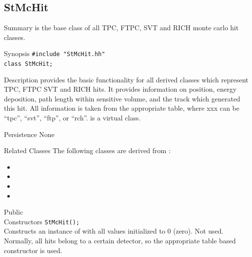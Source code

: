 \clearpage
%
%
\subsection{StMcHit}
 
\label{sec:StMcHit}
\begin{Entry}
\item[Summary]
     is the base class of all TPC, FTPC, SVT and RICH
    monte carlo hit classes.

\item[Synopsis]
    \verb+#include "StMcHit.hh"+\\
    \verb+class StMcHit;+\\

\item[Description]
     provides the basic functionality for all derived classes
    which represent TPC, FTPC SVT and RICH hits. It provides information on
    position, energy deposition, path length within sensitive volume,
    and the track which
    generated this hit.  All information is taken from
    the appropriate  table, where xxx can be ``tpc'', ``svt'',
    ``ftp'', or ``rch''.
     is a virtual class.

\item[Persistence]
    None

\item[Related Classes]
    The following classes are derived from :
    \begin{itemize}
    \item {}
    \item {}
    \item {}
    \item {}
    \end{itemize}

\item[Public\\ Constructors]
    \verb+StMcHit();+\\
    Constructs an instance of  with all values initialized
    to 0 (zero).  Not used.  Normally, all hits belong to a certain detector,
    so the appropriate table based constructor is used.


\end{Entry}
